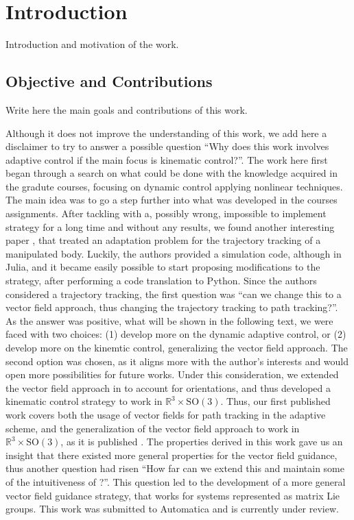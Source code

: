 \chapter{Introduction}\label{chap:Intro}

Introduction and motivation of the work.

\section{Objective and Contributions}

Write here the main goals and contributions of this work.

Although it does not improve the understanding of this work, we add here a disclaimer to try to answer a possible question ``Why does this work involves adaptive control if the main focus is kinematic control?''. The work here first began through a search on what could be done with the knowledge acquired in the gradute courses, focusing on dynamic control applying nonlinear techniques. The main idea was to go a step further into what was developed in the courses assignments. After tackling with a, possibly wrong, impossible to implement strategy for a long time and without any results, we found another interesting paper \citep{Culbertson2021}, that treated an adaptation problem for the trajectory tracking of a manipulated body. Luckily, the authors provided a simulation code, although in Julia, and it became easily possible to start proposing modifications to the strategy, after performing a code translation to Python. Since the authors considered a trajectory tracking, the first question was ``can we change this to a vector field approach, thus changing the trajectory tracking to path tracking?''. As the answer was positive, what will be shown in the following text, we were faced with two choices: (1) develop more on the dynamic adaptive control, or (2) develop more on the kinemtic control, generalizing the vector field approach. The second option was chosen, as it aligns more with the author's interests and would open more possibilities for future works. Under this consideration, we extended the vector field approach in \citet{Rezende2022} to account for orientations, and thus developed a kinematic control strategy to work in $\mathbb{R}^3\times\text{SO}(3)$. Thus, our first published work covers both the usage of vector fields for path tracking in the adaptive scheme, and the generalization of the vector field approach to work in $\mathbb{R}^3\times\text{SO}(3)$, as it is published \citep{Pessoa2024}. The properties derived in this work gave us an insight that there existed more general properties for the vector field guidance, thus another question had risen ``How far can we extend this and maintain some of the intuitiveness of \citet{Rezende2022}?''. This question led to the development of a more general vector field guidance strategy, that works for systems represented as matrix Lie groups. This work was submitted to Automatica and is currently under review.


